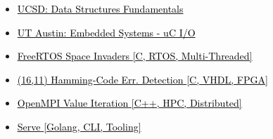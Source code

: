 \documentclass[10pt,a4paper,ragged2e,withhyper]{altacv}
\begin{document}
\begin{paracol}{2}
\begin{itemize}
	\item \href{https://courses.edx.org/certificates/f9250573933e4a3e87e8b28ea989bf99}{{\textcolor{black}{UCSD: Data Structures Fundamentals}}}
	\item \href{https://courses.edx.org/certificates/af6115bce0c646aa95f6aaa6c98acb09}{{\textcolor{black}{UT Austin: Embedded Systems - uC I/O}}}
\end{itemize}



\begin{itemize}
\item \href{https://github.com/duclos-cavalcanti/FreeRTOS-SpaceInvaders}
     {\underline{{\textcolor{black}{FreeRTOS Space Invaders}}} \hfill  \textcolor{black}{[C, RTOS, Multi-Threaded]}}

 \item \href{https://github.com/duclos-cavalcanti/microsemi-error-detection}
     {\underline{{\textcolor{black}{(16,11) Hamming-Code Err. Detection}}} \hfill  \textcolor{black}{[C, VHDL, FPGA]}}

 \item \href{https://github.com/duclos-cavalcanti/Open-MPI-ValueIteration}
     {\underline{{\textcolor{black}{OpenMPI Value Iteration}}} \hfill  \textcolor{black}{[C++, HPC, Distributed]}}

 \item \href{https://github.com/duclos-cavalcanti/serve}
     {\underline{{\textcolor{black}{Serve}}} \hfill \textcolor{black}{[Golang, CLI, Tooling]}}
\end{itemize}


\end{paracol}
\end{document}
